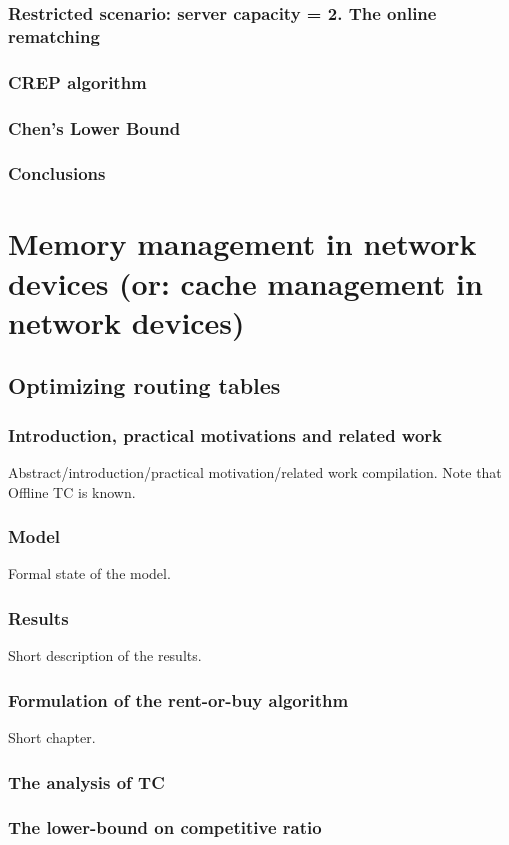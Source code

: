 \documentclass[a4paper]{book}
\begin{document}
\section{Restricted scenario: server capacity = 2. The online rematching}
\section{CREP algorithm}
\section{Chen's Lower Bound}
\section{Conclusions}

\part{Memory management in network devices (or: cache management in network devices)}

\chapter{Optimizing routing tables}

\section{Introduction, practical motivations and related work}

Abstract/introduction/practical motivation/related work compilation.
Note that Offline TC is known.

\section{Model}
Formal state of the model.
\section{Results}
Short description of the results.
\section{Formulation of the rent-or-buy algorithm}
Short chapter.
\section{The analysis of TC}
\section{The lower-bound on competitive ratio}
\end{document}
